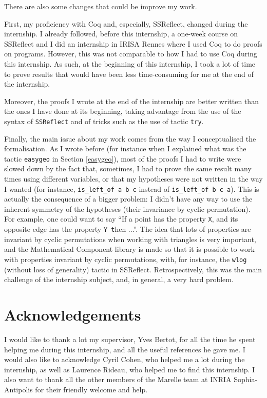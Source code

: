 \documentclass[a4paper,10pt]{article}
\def\ttt#1#2{{\tt{\color{black}#1} #2}}
\begin{document}
There are also some changes that could be improve my work.

First, my proficiency with {\sc Coq} and, especially, {\sc SSReflect}, changed during the internship. I already followed, before this internship, a one-week course on {\sc SSReflect} and I did an internship in IRISA Rennes where I used {\sc Coq} to do proofs on programs. However, this was not comparable to how I had to use {\sc Coq} during this internship. As such, at the beginning of this internship, I took a lot of time to prove results that would have been less time-consuming for me at the end of the internship.

Moreover, the proofs I wrote at the end of the internship are better written than the ones I have done at its beginning, taking advantage from the use of the syntax of {\tt SSReflect} and of tricks such as the use of tactic {\tt try}.

\label{symmetry}
Finally, the main issue about my work comes from the way I conceptualised  the formalisation. As I wrote before (for instance when I explained what was the tactic {\tt easygeo} in Section \ref{easygeo}), most of the proofs I had to write were slowed down by the fact that, sometimes, I had to prove the same result many times using different variables, or that my hypotheses were not written in the way I wanted (for instance, {\tt is\_left\_of a b c} instead of {\tt is\_left\_of b c a}). This is actually the consequence of a bigger problem: I didn't have any way to use the inherent symmetry of the hypotheses (their invariance by cyclic permutation).
For example, one could want to say ``If a point has the property {\tt X}, and its opposite edge has the property \ttt{Y} then ...''. The idea that lots of properties are invariant by cyclic permutations when working with triangles is very important, and the {\sc Mathematical Component} library is made so that it is possible to work with properties invariant by cyclic permutations, with, for instance, the {\tt wlog} (without loss of generality) tactic in {\sc SSReflect}.
Retrospectively, this was the main challenge of the internship subject, and, in general, a very hard problem. 

\section{Acknowledgements}
I would like to thank a lot my supervisor, Yves Bertot, for all the time he spent helping me during this internship, and all the useful references he gave me. I would also like to acknowledge Cyril Cohen, who helped me a lot during the internship, as well as Laurence Rideau, who helped me to find this internship. I also want to thank all the other members of the Marelle team at INRIA Sophia-Antipolis for their friendly welcome and help.
\end{document}
